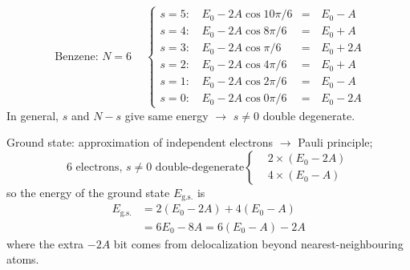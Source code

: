 \documentclass[12pt]{article}
\newcommand{\be}{\begin{equation}}
\newcommand{\ee}{\end{equation}}
\begin{document}
\be
\text { Benzene: } N=6 \quad\
\left\{
\begin{aligned}
s=5: &\,E_{0}-2 A \cos 10 \pi / 6&=&\,E_{0}-A\\ 
s=4: &\,E_{0}-2 A \cos  8 \pi / 6&=&\,E_{0}+A\\ 
s=3: &\,E_{0}-2 A \cos    \pi / 6&=&\,E_{0}+2A\\ 
s=2: &\,E_{0}-2 A \cos  4 \pi / 6&=&\,E_{0}+A\\ 
s=1: &\,E_{0}-2 A \cos  2 \pi / 6&=&\,E_{0}-A\\ 
s=0: &\,E_{0}-2 A \cos  0 \pi / 6&=&\,E_{0}-2A
\end{aligned}
\right.
\ee
In general, $s$ and $N-s$ give same energy 
$\to$ $s\neq0$ double degenerate.

Ground state: approximation of independent electrons 
$\to$ Pauli principle;
\[
\text{6 electrons, $s\neq0$ double-degenerate}
\left\{
\begin{aligned}
&2\times(E_0-2A)\\
&4\times(E_0-A)
\end{aligned}
\right.
\]
so the energy of the ground state $E_\text{g.s.}$ is
\be
\begin{aligned} 
E_{\text {g.s.}} 
&=2\left(E_{0}-2 A\right)+4\left(E_{0}-A\right) \\ 
&=6 E_{0}-8 A=6\left(E_{0}-A\right)-2 A 
\end{aligned}
\ee
where the extra $-2A$ bit comes from
delocalization beyond
nearest-neighbouring atoms.
\end{document}
